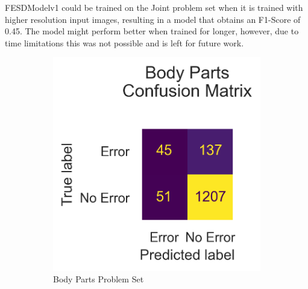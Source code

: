 


FESDModelv1 could be trained on the Joint problem set when it is trained with higher resolution input images, resulting in a model that obtains an F1-Score of 0.45. The model might perform better when trained for longer, however, due to time limitations this was not possible and is left for future work.

\begin{figure}[!htbp]
  \centering
  \begin{subfigure}[b]{0.4\linewidth}
      \centering
      \includegraphics[width=\textwidth]{figures/results_hi/v1/confusion/body_parts_together.png}
      \caption[]{Body Parts Problem Set}
      \label{fig:hi_bp_conf_v1}
  \end{subfigure}
  \hfill
  \begin{subfigure}[b]{0.4\linewidth}
      \centering

\end{subfigure}
\end{figure}
